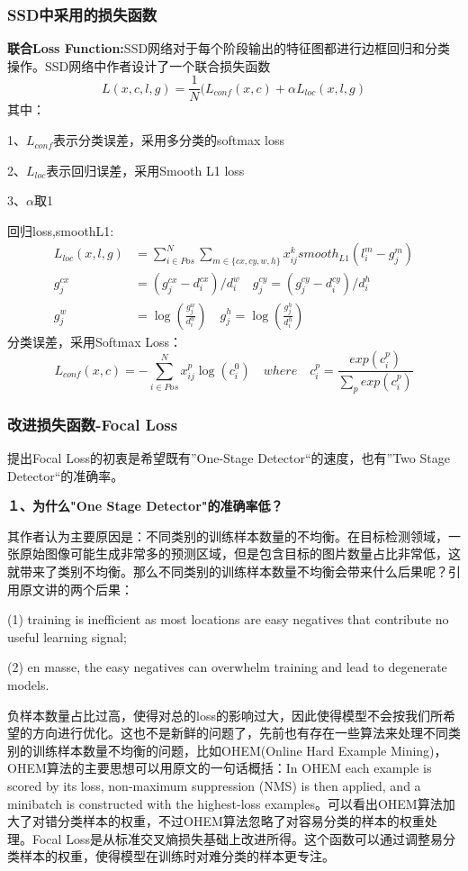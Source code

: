 \subsubsection{SSD中采用的损失函数}
\textbf{联合Loss Function:}SSD网络对于每个阶段输出的特征图都进行边框回归和分类操作。SSD网络中作者设计了一个联合损失函数
\begin{equation}
	L(x,c,l,g) = \frac{1}{N}(L_{conf}(x,c) + \alpha L_{loc}(x,l,g)
\end{equation}
其中：

 1、$L_{conf}$表示分类误差，采用多分类的softmax loss
 
 2、$L_{loc}$表示回归误差，采用Smooth L1 loss
 
 3、$\alpha$取1
 
回归loss,smoothL1:
\begin{align}
	L_{loc}(x,l,g) &= \sum _{i \in Pos} ^{N} \sum_{m \in \{cx,cy,w,h\}} x_{ij}^k smooth _{L1} (l_i ^m - g_j ^m) \\
	g_j^{cx} &= \left( g_j ^{cx} - d_i ^{cx} \right) / d_i ^w \quad g_j^{cy} = (g_j^{cy} - d_i^{cy}) / d_i ^h \\
	g_j^w &= \log(\frac{g_j^w}{d_i^w}) \quad g_j^h = \log(\frac{g_j^h}{d_i^h})
\end{align}	
分类误差，采用Softmax Loss：
\begin{equation}
L_{conf}(x, c) = -\sum_{i \in Pos}^N x_{ij}^p\log(c_i^0) \quad where \quad c_i^p = \frac{exp(c_i^p)}{\sum_{p}exp(c_i^p)} 
\end{equation}
\subsubsection{改进损失函数-Focal Loss}
提出Focal Loss的初衷是希望既有”One-Stage Detector“的速度，也有”Two Stage Detector“的准确率。

\textbf{１、为什么"One Stage Detector"的准确率低？}

其作者认为主要原因是：不同类别的训练样本数量的不均衡。在目标检测领域，一张原始图像可能生成非常多的预测区域，但是包含目标的图片数量占比非常低，这就带来了类别不均衡。那么不同类别的训练样本数量不均衡会带来什么后果呢？引用原文讲的两个后果：

(1) training is inefficient as most locations are easy negatives that contribute no useful learning signal; 

(2) en masse, the easy negatives can overwhelm training and lead to degenerate models. \cite{focal-loss}

负样本数量占比过高，使得对总的loss的影响过大，因此使得模型不会按我们所希望的方向进行优化。这也不是新鲜的问题了，先前也有存在一些算法来处理不同类别的训练样本数量不均衡的问题，比如OHEM(Online Hard Example Mining)\cite{ohem}，OHEM算法的主要思想可以用原文的一句话概括：In OHEM each example is scored by its loss, non-maximum suppression (NMS\cite{soft-nms}) is then applied, and a minibatch is constructed with the highest-loss examples。\cite{ohem}可以看出OHEM算法加大了对错分类样本的权重，不过OHEM算法忽略了对容易分类的样本的权重处理。Focal Loss是从标准交叉熵损失基础上改进所得。这个函数可以通过调整易分类样本的权重，使得模型在训练时对难分类的样本更专注。

